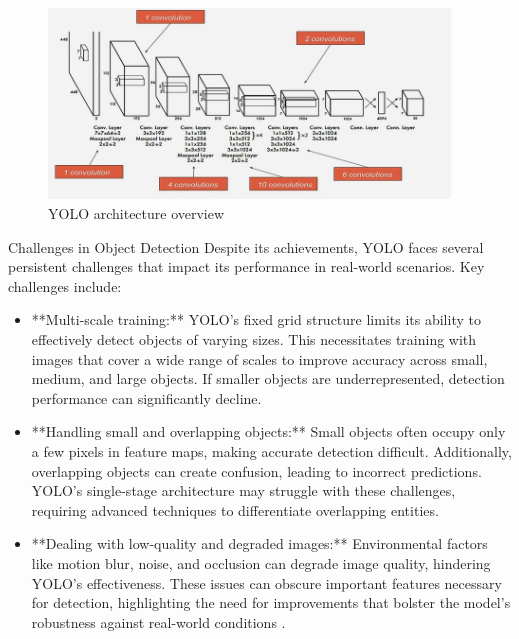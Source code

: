 \documentclass[final]{beamer}
\newlength{\colwidth}
\begin{document}
\begin{frame}[t]
\begin{columns}[t]
\begin{column}{\colwidth}
  \begin{figure}
    \centering
    \includegraphics[width=0.95\textwidth]{logos/yolo_architecture.png}
    \caption{YOLO architecture overview}
    \label{fig:arch}
  \end{figure}

\begin{block}{Challenges in Object Detection}
    Despite its achievements, YOLO faces several persistent challenges that impact its performance in real-world scenarios. Key challenges include:

    \begin{itemize}
      \item **Multi-scale training:** YOLO's fixed grid structure limits its ability to effectively detect objects of varying sizes. This necessitates training with images that cover a wide range of scales to improve accuracy across small, medium, and large objects. If smaller objects are underrepresented, detection performance can significantly decline.

      \item **Handling small and overlapping objects:** Small objects often occupy only a few pixels in feature maps, making accurate detection difficult. Additionally, overlapping objects can create confusion, leading to incorrect predictions. YOLO's single-stage architecture may struggle with these challenges, requiring advanced techniques to differentiate overlapping entities.

      \item **Dealing with low-quality and degraded images:** Environmental factors like motion blur, noise, and occlusion can degrade image quality, hindering YOLO’s effectiveness. These issues can obscure important features necessary for detection, highlighting the need for improvements that bolster the model’s robustness against real-world conditions \cite{6}.
    \end{itemize}


\end{block}
\end{column}
\end{columns}
\end{frame}
\end{document}
